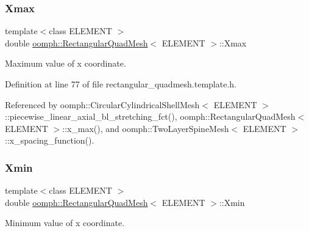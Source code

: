\mbox{\label{classoomph_1_1RectangularQuadMesh_ab8e4ddba0ce8315cf480cdd1f3447684}} 
\subsubsection{\texorpdfstring{Xmax}{Xmax}}
{\footnotesize\ttfamily template$<$class E\+L\+E\+M\+E\+NT $>$ \\
double \hyperlink{classoomph_1_1RectangularQuadMesh}{oomph\+::\+Rectangular\+Quad\+Mesh}$<$ E\+L\+E\+M\+E\+NT $>$\+::Xmax\hspace{0.3cm}{\ttfamily [protected]}}



Maximum value of x coordinate. 



Definition at line 77 of file rectangular\+\_\+quadmesh.\+template.\+h.



Referenced by oomph\+::\+Circular\+Cylindrical\+Shell\+Mesh$<$ E\+L\+E\+M\+E\+N\+T $>$\+::piecewise\+\_\+linear\+\_\+axial\+\_\+bl\+\_\+stretching\+\_\+fct(), oomph\+::\+Rectangular\+Quad\+Mesh$<$ E\+L\+E\+M\+E\+N\+T $>$\+::x\+\_\+max(), and oomph\+::\+Two\+Layer\+Spine\+Mesh$<$ E\+L\+E\+M\+E\+N\+T $>$\+::x\+\_\+spacing\+\_\+function().

\mbox{\label{classoomph_1_1RectangularQuadMesh_af3aab508d077460545031e758396514a}} 
\subsubsection{\texorpdfstring{Xmin}{Xmin}}
{\footnotesize\ttfamily template$<$class E\+L\+E\+M\+E\+NT $>$ \\
double \hyperlink{classoomph_1_1RectangularQuadMesh}{oomph\+::\+Rectangular\+Quad\+Mesh}$<$ E\+L\+E\+M\+E\+NT $>$\+::Xmin\hspace{0.3cm}{\ttfamily [protected]}}



Minimum value of x coordinate. 



